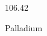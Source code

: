 \documentclass[12pt]{article}
\begin{document}
\hfill{}
\vfill
\begin{center}
  {\fontsize{50}{60}
  }

  106.42

Palladium
\end{center}
\vfill
\end{document}
